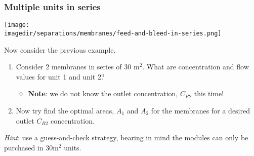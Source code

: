 \begin{frame}\frametitle{Multiple units in series}
	\begin{center}
		\texttt{[image: \\imagedir/separations/membranes/feed-and-bleed-in-series.png]}
	\end{center}

	Now consider the previous example.
    \begin{enumerate}
        \item    Consider 2 membranes in series of 30 m$^2$. What are concentration and flow values for unit 1 and unit 2?
		\begin{itemize}
			\item	{\color{myOrange}\textbf{Note}: we do not know the outlet concentration, $C_{R2}$ this time!}
		\end{itemize}
        \item    Now try find the optimal areas, $A_1$ and $A_2$ for the membranes {\color{myOrange}for a desired outlet  $C_{R2}$ concentration}.
    \end{enumerate} 
    
    \vspace{12pt}
    \emph{Hint}: use a guess-and-check strategy, bearing in mind the modules can only be purchased in 30m$^2$ units.
\end{frame}

